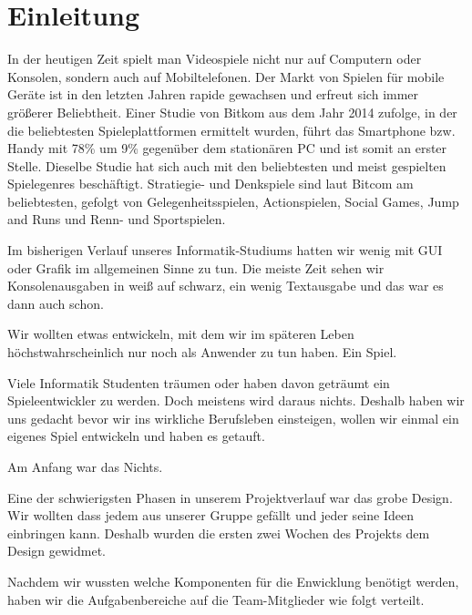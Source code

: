 \chapter{Einleitung}\label{ch:intro}

\label{sec:1_Ausgangssituation}

In der heutigen Zeit spielt man Videospiele nicht nur auf Computern oder Konsolen, sondern auch auf Mobiltelefonen. Der Markt von Spielen für mobile Geräte ist in den letzten Jahren rapide gewachsen und erfreut sich immer größerer Beliebtheit. Einer Studie von Bitkom \cite{bitkomgaming} aus dem Jahr 2014 zufolge, in der die beliebtesten Spieleplattformen ermittelt wurden, führt das Smartphone bzw. Handy mit 78\% um 9\% gegenüber dem stationären PC und ist somit an erster Stelle. Dieselbe Studie hat sich auch mit den beliebtesten und meist gespielten Spielegenres beschäftigt. Stratiegie- und Denkspiele sind laut Bitcom am beliebtesten, gefolgt von Gelegenheitsspielen, Actionspielen, Social Games, Jump and Runs und Renn- und Sportspielen.




\label{sec:1_Motivation}

Im bisherigen Verlauf unseres Informatik-Studiums hatten wir wenig mit GUI oder Grafik im allgemeinen Sinne zu tun. Die meiste Zeit sehen wir Konsolenausgaben in weiß auf schwarz, ein wenig Textausgabe und das war es dann auch schon. 

Wir wollten etwas entwickeln, mit dem wir im späteren Leben höchstwahrscheinlich nur noch als Anwender zu tun haben. Ein Spiel. 

Viele Informatik Studenten träumen oder haben davon geträumt ein Spieleentwickler zu werden. Doch meistens wird daraus nichts. Deshalb haben wir uns gedacht bevor wir ins wirkliche Berufsleben einsteigen, wollen wir einmal ein eigenes Spiel entwickeln und haben es \gamename getauft.


\newpage
{}\label{sec:1_Vorgehen}

Am Anfang war das Nichts.

Eine der schwierigsten Phasen in unserem Projektverlauf war das grobe Design. Wir wollten dass  \gamename jedem aus unserer Gruppe gefällt und jeder seine Ideen einbringen kann. Deshalb wurden die ersten zwei Wochen des Projekts dem Design gewidmet. 

Nachdem wir wussten welche Komponenten für die Enwicklung benötigt werden, haben wir die Aufgabenbereiche auf die Team-Mitglieder wie folgt verteilt.

